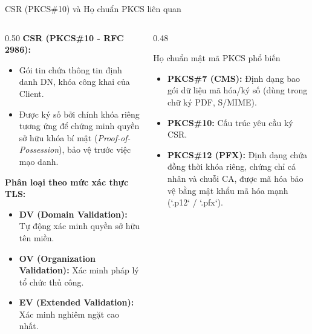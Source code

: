 \documentclass[10pt, aspectratio=169]{beamer}
\begin{document}
\begin{frame}{CSR (PKCS\#10) và Họ chuẩn PKCS liên quan}
    \begin{columns}[onlytextwidth]
        \begin{column}{0.50\textwidth}
            \textbf{CSR (PKCS\#10 - RFC 2986):}
            \begin{itemize}
                \item Gói tin chứa thông tin định danh DN, khóa công khai của Client.
                \item Được ký số bởi chính khóa riêng tương ứng để chứng minh quyền sở hữu khóa bí mật (\textit{Proof-of-Possession}), bảo vệ trước việc mạo danh.
            \end{itemize}
            \vspace{0.2cm}
            \textbf{Phân loại theo mức xác thực TLS:}
            \begin{itemize}
                \item \textbf{DV (Domain Validation):} Tự động xác minh quyền sở hữu tên miền.
                \item \textbf{OV (Organization Validation):} Xác minh pháp lý tổ chức thủ công.
                \item \textbf{EV (Extended Validation):} Xác minh nghiêm ngặt cao nhất.
            \end{itemize}
        \end{column}
        \begin{column}{0.48\textwidth}
            \begin{block}{Họ chuẩn mật mã PKCS phổ biến}
                \begin{itemize}
                    \item \textbf{PKCS\#7 (CMS):} Định dạng bao gói dữ liệu mã hóa/ký số (dùng trong chữ ký PDF, S/MIME).
                    \item \textbf{PKCS\#10:} Cấu trúc yêu cầu ký CSR.
                    \item \textbf{PKCS\#12 (PFX):} Định dạng chứa đồng thời khóa riêng, chứng chỉ cá nhân và chuỗi CA, được mã hóa bảo vệ bằng mật khẩu mã hóa mạnh (`.p12` / `.pfx`).
                \end{itemize}
            \end{block}
        \end{column}
    \end{columns}
\end{frame}
\end{document}
